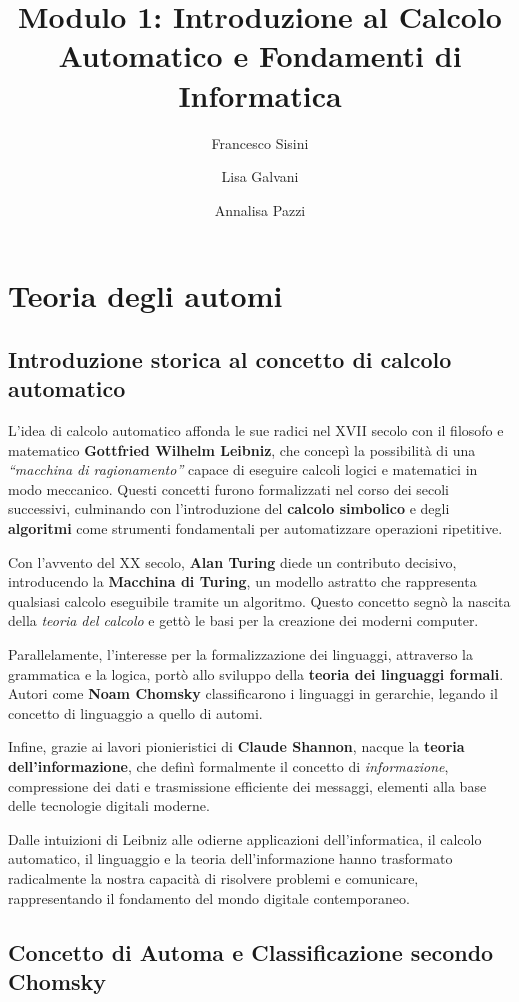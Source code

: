 \documentclass[a4paper,12pt]{report}
\title{\textbf{Modulo 1: Introduzione al Calcolo Automatico e Fondamenti di Informatica}}
\author[1]{Francesco Sisini}
\author[2]{Lisa Galvani} %
\author[3]{Annalisa Pazzi} %
\affil[1]{Docente esperto di informatica e matematica applicate alle STEM}
\affil[2]{Tutor corsi STEM}
\affil[3]{Consulenza artistica e creativa}
\date{}
\begin{document}
\small
\maketitle
\chapter{Teoria degli automi}
\section*{Introduzione storica al concetto di calcolo automatico}

L'idea di calcolo automatico affonda le sue radici nel XVII secolo con il filosofo e matematico \textbf{Gottfried Wilhelm Leibniz}, che concepì la possibilità di una \textit{“macchina di ragionamento”} capace di eseguire calcoli logici e matematici in modo meccanico. Questi concetti furono formalizzati nel corso dei secoli successivi, culminando con l'introduzione del \textbf{calcolo simbolico} e degli \textbf{algoritmi} come strumenti fondamentali per automatizzare operazioni ripetitive.

Con l'avvento del XX secolo, \textbf{Alan Turing} diede un contributo decisivo, introducendo la \textbf{Macchina di Turing}, un modello astratto che rappresenta qualsiasi calcolo eseguibile tramite un algoritmo. Questo concetto segnò la nascita della \textit{teoria del calcolo} e gettò le basi per la creazione dei moderni computer.

Parallelamente, l'interesse per la formalizzazione dei linguaggi, attraverso la grammatica e la logica, portò allo sviluppo della \textbf{teoria dei linguaggi formali}. Autori come \textbf{Noam Chomsky} classificarono i linguaggi in gerarchie, legando il concetto di linguaggio a quello di automi.

Infine, grazie ai lavori pionieristici di \textbf{Claude Shannon}, nacque la \textbf{teoria dell'informazione}, che definì formalmente il concetto di \textit{informazione}, compressione dei dati e trasmissione efficiente dei messaggi, elementi alla base delle tecnologie digitali moderne.

Dalle intuizioni di Leibniz alle odierne applicazioni dell'informatica, il calcolo automatico, il linguaggio e la teoria dell'informazione hanno trasformato radicalmente la nostra capacità di risolvere problemi e comunicare, rappresentando il fondamento del mondo digitale contemporaneo.


\section*{Concetto di Automa e Classificazione secondo Chomsky}
\end{document}
